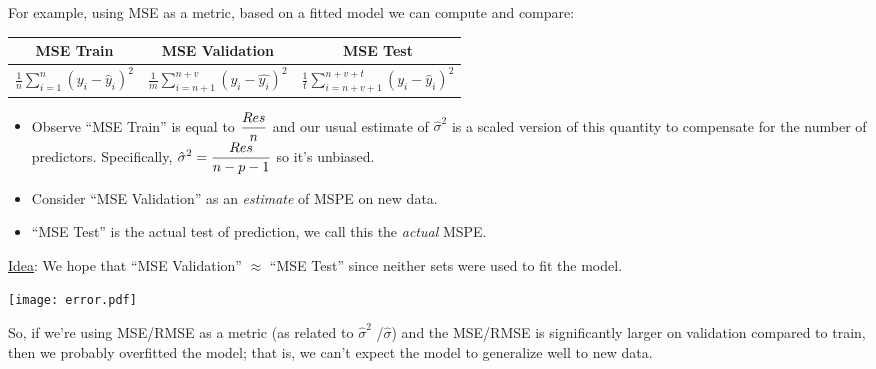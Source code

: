 For example, using MSE as a metric, based on a fitted model we can
compute and compare:
\begin{table}[ht]
      \centering
      \begin{NiceTabular}{|c|c|c|}
            \toprule
            MSE Train & MSE Validation & MSE Test \\
            \midrule
            $ \frac{1}{n} \sum_{i=1}^{n} (y_i-\hat{y}_i)^2 $
            &
            $ \frac{1}{m} \sum_{i=n+1}^{n+v} (y_i-\hat{y_i})^2 $
            &
            $ \frac{1}{t} \sum_{i=n+v+1}^{n+v+t}(y_i-\hat{y}_i)^2 $
            \\
            \bottomrule
      \end{NiceTabular}
\end{table}

\begin{itemize}
      \item Observe ``MSE Train'' is equal to $ \displaystyle \frac{\relax{Res}}{n} $
            and our usual estimate of $ \hat{\sigma}^2 $
            is a scaled version of this quantity
            to compensate for the number of predictors. Specifically,
            $ \displaystyle  \hat{\sigma}^2=\frac{\relax{Res}}{n-p-1} $
            so it's unbiased.
      \item Consider ``MSE Validation'' as an \emph{estimate} of MSPE
            on new data.
      \item ``MSE Test'' is the actual test of prediction,
            we call this the \emph{actual} MSPE.\
\end{itemize}
\underline{Idea}: We hope that ``MSE Validation'' $ \approx $
``MSE Test'' since neither sets were used to fit the model.

\begin{minipage}{0.7\textwidth}
      \texttt{[image: error.pdf]}
\end{minipage}
\begin{minipage}{0.23\textwidth}
      \raggedright{}
      So, if we're using MSE/RMSE
      as a metric (as related to $ \hat{\sigma}^2 $ /$ \hat{\sigma} $)
      and the MSE/RMSE is significantly larger
      on validation compared to train,
      then we probably overfitted the model;
      that is, we can't expect the model
      to generalize well to new data.
\end{minipage}
